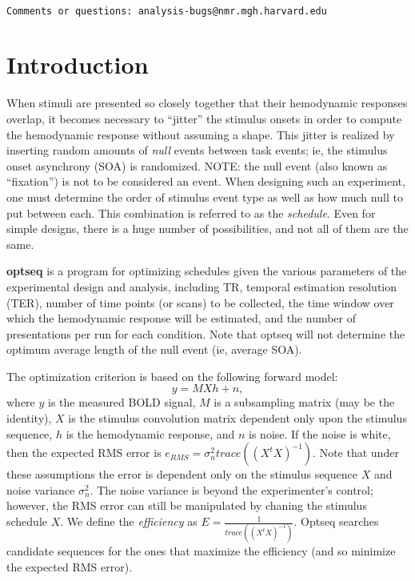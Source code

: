 \documentclass[10pt]{article}
\begin{document}
\begin{Large}
 \\
\end{Large}

\noindent 
\begin{verbatim}
Comments or questions: analysis-bugs@nmr.mgh.harvard.edu
\end{verbatim}

\section{Introduction}

When stimuli are presented so closely together that their hemodynamic
responses overlap, it becomes necessary to ``jitter'' the stimulus
onsets in order to compute the hemodynamic response without assuming a
shape. This jitter is realized by inserting random amounts of {\em
null} events between task events; ie, the stimulus onset asynchrony
(SOA) is randomized. NOTE: the null event (also known as ``fixation'')
is not to be considered an event. When designing such an experiment,
one must determine the order of stimulus event type as well as how
much null to put between each. This combination is referred to as the
{\em schedule}. Even for simple designs, there is a huge number of
possibilities, and not all of them are the same. 

{\bf optseq} is a program for optimizing schedules given the various
parameters of the experimental design and analysis, including TR,
temporal estimation resolution (TER), number of time points (or scans)
to be collected, the time window over which the hemodynamic response
will be estimated, and the number of presentations per run for each
condition. Note that optseq will not determine the optimum average
length of the null event (ie, average SOA). 

The optimization criterion is based on the following forward model:
\begin{equation}
y = M X h + n,
\label{fmrix.eqn}
\end{equation}
where $y$ is the measured BOLD signal, $M$ is a subsampling matrix
(may be the identity), $X$ is the stimulus convolution matrix
dependent only upon the stimulus sequence, $h$ is the hemodynamic
response, and $n$ is noise.  If the noise is white, then the expected
RMS error is $e_{RMS} = \sigma_n^2 trace((X^t X)^{-1})$.  Note that
under these assumptions the error is dependent only on the stimulus
sequence $X$ and noise variance $\sigma_n^2$.  The noise variance is
beyond the experimenter's control; however, the RMS error can still be
manipulated by chaning the stimulus schedule $X$.  We define the {\em
efficiency} as $E = \frac{1}{trace((X^t X)^{-1})}$. Optseq
searches candidate sequences for the ones that maximize the efficiency
(and so minimize the expected RMS error).\\
\end{document}
